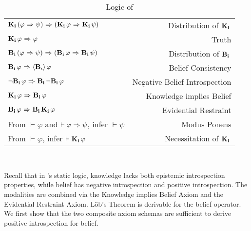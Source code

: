 \section{\DASL}
\label{sec:crap}

\begin{table}[H]
	\begin{center}
		\begin{tabular}{| l r |}
			\hline
			$\mathbf{K}_{\mathbf{i}}\,(\varphi {\ \Rightarrow \ } \psi) {\ \Rightarrow \ } (\mathbf{K}_{\mathbf{i}}\,\varphi {\ \Rightarrow \ } \mathbf{K}_{\mathbf{i}}\,\psi)$ & Distribution of $\mathbf{K}_{\mathbf{i}}\,$ \\
			$\mathbf{K}_{\mathbf{i}}\,\varphi {\ \Rightarrow \ } \varphi$ & Truth \\
			$\mathbf{B}_{\mathbf{i}}\,(\varphi {\ \Rightarrow \ } \psi) {\ \Rightarrow \ } (\mathbf{B}_{\mathbf{i}}\,\varphi {\ \Rightarrow \ } \mathbf{B}_{\mathbf{i}}\,\psi)$ & Distribution of $\mathbf{B}_{\mathbf{i}}\,$\\
			$\mathbf{B}_{\mathbf{i}}\,\varphi {\ \Rightarrow \ } \langle \mathbf{B}_{i} \rangle\,\varphi$ & Belief Consistency \\
			${\neg}\mathbf{B}_{\mathbf{i}}\,\varphi {\ \Rightarrow \ } \mathbf{B}_{\mathbf{i}}\,{\neg}\mathbf{B}_{\mathbf{i}}\,\varphi$ & Negative Belief Introspection\\
			$\mathbf{K}_{\mathbf{i}}\,\varphi {\ \Rightarrow \ } \mathbf{B}_{\mathbf{i}}\,\varphi$ & Knowledge implies Belief \\
			$\mathbf{B}_{\mathbf{i}}\,\varphi {\ \Rightarrow \ } \mathbf{B}_{\mathbf{i}}\,\mathbf{K}_{\mathbf{i}}\,\varphi$ & Evidential Restraint\\
			From $\vdash \varphi$ and $\vdash \varphi {\ \Rightarrow \ } \psi$, infer $\vdash\psi$ & Modus Ponens\\
			From $\vdash \varphi$, infer $\vdash \mathbf{K}_{\mathbf{i}}\,\varphi$ & Necessitation of $\mathbf{K}_{\mathbf{i}}\,$\\
			\hline
		\end{tabular}
		\caption{Logic of \DASL}~\label{DASL-static}
	\end{center}
\end{table}

Recall that in \DASL's static logic, knowledge lacks both epistemic introspection properties, while belief has negative introspection and positive introspection. The modalities are combined via the Knowledge implies Belief Axiom and the Evidential Restraint Axiom. L\"ob's Theorem is derivable for the belief operator. We first show that the two composite axiom schemas are sufficient to derive positive introspection for belief.

